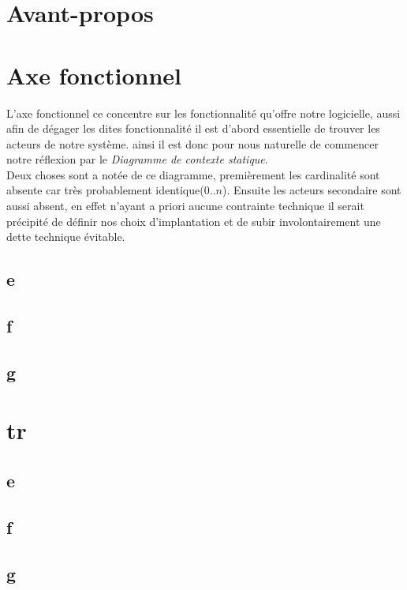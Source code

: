 \documentclass[a4paper,french,final]{memoir}
\begin{document}
\begin{titlingpage}
\hypersetup{pageanchor=false}

\end{titlingpage}
\frontmatter
\tableofcontents
\chapter{Avant-propos}
\mainmatter
\chapter{Axe fonctionnel}
\begin{center}

\end{center}
L'axe fonctionnel ce concentre sur les fonctionnalité qu'offre notre logicielle, aussi afin de dégager les dites fonctionnalité il est d'abord essentielle de trouver les acteurs de notre système. ainsi il est donc pour nous naturelle de commencer notre réflexion par le \emph{Diagramme de contexte statique}.\\ 
Deux choses sont a notée de ce diagramme, premièrement les cardinalité sont absente car très probablement identique($0..n$). Ensuite les acteurs secondaire sont aussi absent, en effet n'ayant a priori aucune contrainte technique il serait précipité de définir nos choix d'implantation et de subir involontairement une dette technique évitable.
\section{e}
\section{f}
\section{g}
\chapter{}
\appendixpage
\appendix

\chapter{tr}
\section{e}
\section{f}
\section{g}
\backmatter
\end{document}
